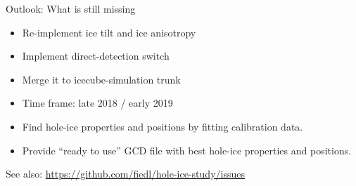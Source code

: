 
\begin{frame}{Outlook: What is still missing}
  \begin{itemize}
    \item Re-implement ice tilt and ice anisotropy
    \item Implement direct-detection switch
    \item Merge it to icecube-simulation trunk
    \item Time frame: late 2018 / early 2019
  \end{itemize}

  \bigskip
  \begin{itemize}
    \item Find hole-ice properties and positions by fitting calibration data.
    \item Provide ``ready to use'' GCD file with best hole-ice properties and positions.
  \end{itemize}

  \bigskip

  See also: \url{https://github.com/fiedl/hole-ice-study/issues}
\end{frame}
